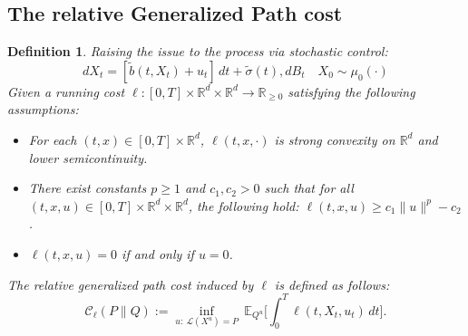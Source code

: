 \documentclass[11pt]{article}
\newtheorem{definition}{Definition}[section]
\def\w{\widetilde}
\begin{document}
\subsection{The relative Generalized Path cost}

\begin{definition}
\label{def:gencost}
Raising the issue to the process via stochastic control:
\begin{equation}
\label{state}
d X_t = [\w{b}(t,{X}_t)+u_t ]\, dt +  \w{\sigma}(t), dB_t
\quad X_0 \sim  \mu_{0}(\cdot)
\end{equation}
Given a running cost $\ell : [0,T] \times \mathbb{R}^d \times \mathbb{R}^d \to \mathbb{R}_{\ge 0}$ satisfying the following assumptions:
\begin{itemize}
\item[(H1)] For each $(t, x)\in [0,T] \times \mathbb{R}^d$, $\ell(t, x , \cdot)$ is strong convexity on $\mathbb{R}^d$ and lower semicontinuity.
\item[(H2)] There exist constants $p \ge 1$ and $c_1, c_2 > 0$ such that for all $(t,x,u) \in [0,T] \times \mathbb{R}^d \times \mathbb{R}^d$, the following hold: $\ell(t,x,u) \geq c_1 \|u\|^p - c_2$.
\item[(H3)] $\ell(t, x, u) = 0$ if and only if $u = 0$.

\end{itemize}
The relative generalized path cost induced by $\ell $ is defined as follows:
\begin{equation}
\mathcal C_\ell(P\|Q):=\inf_{u:\ \mathcal L(X^u)=P}\ \mathbb{E}_{Q^u}\Big[\int_0^T\ell(t,X_t,u_t)\,dt\Big]. 
\end{equation}
\end{definition}
\end{document}

